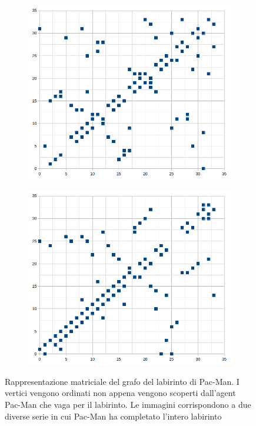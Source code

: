 \documentclass[8pt]{book}
\begin{document}
\begin{figure}
  \centering
  \begin{subfigure}[b]{0.49\textwidth}
    \includegraphics[width=\textwidth]{img/tuki_grafo_2.png}
   \end{subfigure}
  \begin{subfigure}[b]{0.49\textwidth}
    \includegraphics[width=\textwidth]{img/tuki_grafo.png}
  \end{subfigure}
  \caption{Rappresentazione matriciale del grafo del labirinto di Pac-Man. I vertici vengono ordinati non appena vengono scoperti dall'agent Pac-Man che vaga per il labirinto. Le immagini corrispondono a due diverse serie in cui Pac-Man ha completato l'intero labirinto}
  \label{grafiProdotti}
\end{figure}
\end{document}
